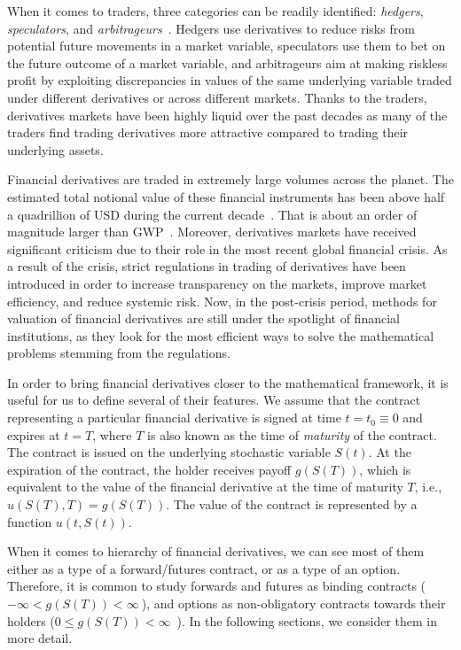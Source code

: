 \documentclass{UUThesisTemplate}
\begin{document}
\par
When it comes to traders, three categories can be readily identified: \emph{hedgers}, \emph{speculators}, and \emph{arbitrageurs}~\cite{hull2017options}. Hedgers use derivatives to reduce risks from potential future movements in a market variable, speculators use them to bet on the future outcome of a market variable, and arbitrageurs aim at making riskless profit by exploiting discrepancies in values of the same underlying variable traded under different derivatives or across different markets. Thanks to the traders, derivatives markets have been highly liquid over the past decades as many of the traders find trading derivatives more attractive compared to trading their underlying assets.

\par
Financial derivatives are traded in extremely large volumes across the planet. %
The estimated total notional value of these financial instruments has been above half a quadrillion of USD during the current decade~\cite{bank2018annual}. That is about an order of magnitude larger than GWP~\cite{worldgdp2018annual}. Moreover, derivatives markets have received significant criticism due to their role in the most recent global financial crisis.  As a result of the crisis, strict regulations in trading of derivatives have been introduced in order to increase transparency on the markets, improve market efficiency, and reduce systemic risk. Now, in the post-crisis period, methods for valuation of financial derivatives are still under the spotlight of financial institutions, as they look for the most efficient ways to solve the mathematical problems stemming from the regulations.

\par
In order to bring financial derivatives closer to the mathematical framework, it is useful for us to define several of their features. We assume that the contract representing a particular financial derivative is signed at time $t=t_0\equiv0$ and expires at $t=T$, where $T$ is also known as the time of \emph{maturity} of the contract. The contract is issued on the underlying stochastic variable $S(t)$. At the expiration of the contract, the holder receives payoff $g(S(T))$, which is equivalent to the value of the financial derivative at the time of maturity $T$, i.e., $u(S(T),T) = g(S(T))$. The value of the contract is represented by a function $u(t,S(t))$.

\par
When it comes to hierarchy of financial derivatives, we can see most of them either as a type of a forward/futures contract, or as a type of an option. Therefore, it is common to study forwards and futures as binding contracts ($-\infty < g(S(T)) < \infty\ $), and options as non-obligatory contracts towards their holders ($0\leq g(S(T))<\infty$\ ). In the following sections, we consider them in more detail.
%
\end{document}
